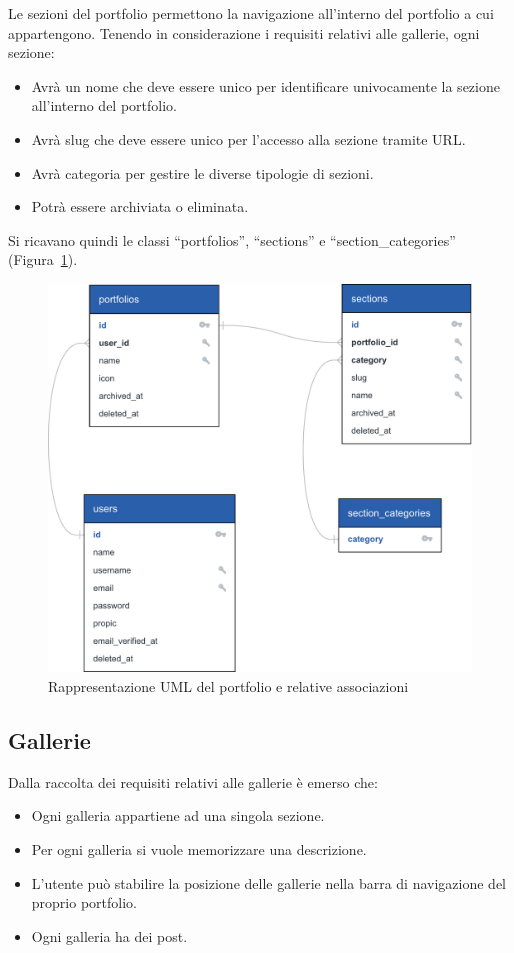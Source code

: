 Le sezioni del portfolio permettono la navigazione all'interno del portfolio a cui appartengono. Tenendo in considerazione i requisiti relativi alle gallerie, ogni sezione:
\begin{itemize}
	\item Avr\`a un nome che deve essere unico per identificare univocamente la sezione all'interno del portfolio.
	\item Avr\`a  slug che deve essere unico per l'accesso alla sezione tramite URL.
	\item Avr\`a  categoria per gestire le diverse tipologie di sezioni.
	\item Potr\`a essere archiviata o eliminata.
\end{itemize}

Si ricavano quindi le classi ``portfolios'', ``sections'' e ``section\_categories'' (Figura~\ref{fig:portfolio_db}).

\begin{figure}[htbp]
	\centering
	\includegraphics[width=0.8\linewidth]{figure/portfolio_db}
	\caption{Rappresentazione UML del portfolio e relative associazioni}
	\label{fig:portfolio_db}
\end{figure}

\subsection{Gallerie}
Dalla raccolta dei requisiti relativi alle gallerie \`e emerso che:
\begin{itemize}
	\item Ogni galleria appartiene ad una singola sezione.
	\item Per ogni galleria si vuole memorizzare una descrizione.
	\item L'utente pu\`o stabilire la posizione delle gallerie nella barra di navigazione del proprio portfolio.
	\item Ogni galleria ha dei post.
\end{itemize}

